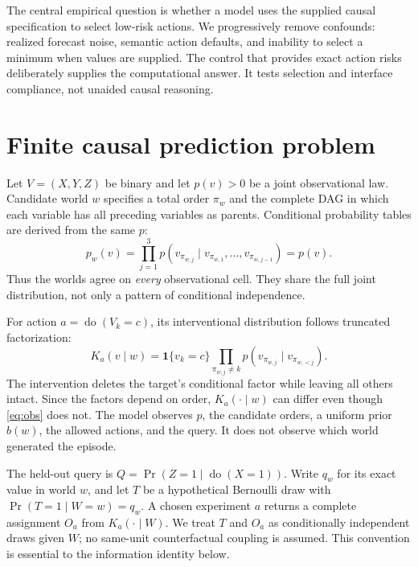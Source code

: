 \documentclass[10pt]{article}
\newcommand{\doop}{\operatorname{do}}
\begin{document}
The central empirical question is whether a model uses the supplied causal specification to select low-risk actions. We progressively remove confounds: realized forecast noise, semantic action defaults, and inability to select a minimum when values are supplied. The control that provides exact action risks deliberately supplies the computational answer. It tests selection and interface compliance, not unaided causal reasoning.

\section{Finite causal prediction problem}
Let $V=(X,Y,Z)$ be binary and let $p(v)>0$ be a joint observational law. Candidate world $w$ specifies a total order $\pi_w$ and the complete DAG in which each variable has all preceding variables as parents. Conditional probability tables are derived from the same $p$:
\begin{equation}
 p_w(v)=\prod_{j=1}^{3}p\!\left(v_{\pi_{w,j}}\mid
 v_{\pi_{w,1}},\ldots,v_{\pi_{w,j-1}}\right)=p(v).
 \label{eq:obs}
\end{equation}
Thus the worlds agree on \emph{every} observational cell. They share the full joint distribution, not only a pattern of conditional independence.

For action $a=\doop(V_k=c)$, its interventional distribution follows truncated factorization:
\begin{equation}
 K_a(v\mid w)=\mathbf 1\{v_k=c\}
 \prod_{\pi_{w,j}\ne k}
 p\!\left(v_{\pi_{w,j}}\mid v_{\pi_{w,<j}}\right).
 \label{eq:trunc}
\end{equation}
The intervention deletes the target's conditional factor while leaving all others intact. Since the factors depend on order, $K_a(\cdot\mid w)$ can differ even though \eqref{eq:obs} does not. The model observes $p$, the candidate orders, a uniform prior $b(w)$, the allowed actions, and the query. It does not observe which world generated the episode.

The held-out query is $Q=\Pr(Z=1\mid\doop(X=1))$. Write $q_w$ for its exact value in world $w$, and let $T$ be a hypothetical Bernoulli draw with $\Pr(T=1\mid W=w)=q_w$. A chosen experiment $a$ returns a complete assignment $O_a$ from $K_a(\cdot\mid W)$. We treat $T$ and $O_a$ as conditionally independent draws given $W$; no same-unit counterfactual coupling is assumed. This convention is essential to the information identity below.
\end{document}
